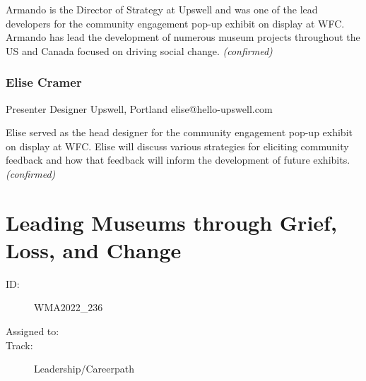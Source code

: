 \documentclass{report}
\begin{document}
                

                Armando is the Director of Strategy at Upswell and was one of the lead developers for the community engagement pop-up exhibit on display at WFC. Armando has lead the development of numerous museum projects throughout the US and Canada focused on driving social change.
                \emph{ (confirmed) }
              

              
                \subsubsection*{ Elise Cramer }
                Presenter\newline
                Designer\newline
                Upswell, Portland
                \newline
                elise@hello-upswell.com\newline
                
                

                Elise served as the head designer for the community engagement pop-up exhibit on display at WFC. Elise will discuss various strategies for eliciting community feedback and how that feedback will inform the development of future exhibits.
                \emph{ (confirmed) }
              

              

              
        
          \newpage
          \section{ Leading Museums through Grief, Loss, and Change }
            \begin{description}
              \item [ID:]
              WMA2022\_236

              \item [Assigned to:]
                \item [Track:]Leadership/Careerpath~
              \end{description}
\end{document}
